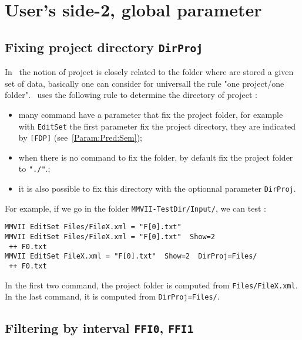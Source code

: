 \section{User's side-2, global parameter}



\subsection{Fixing project directory {\tt DirProj}}

\label{Fix:Dir:Proj}

In \PPP\, the notion of  project is closely related to the folder where
are stored a given set of data, basically one can consider for universall the rule 
"one project/one folder".
\PPP\, uses the following rule to determine the directory of project  :

\begin{itemize}
   \item  many command have a parameter that fix the project folder,
          for example with {\tt EditSet} the first parameter fix the 
          project directory, they are indicated by {\tt [FDP]} (see~\ref{Param:Pred:Sem});

   \item  when there is no command to fix the folder, by default \PPP
          fix the project folder to {\tt "./"}.;

    \item it is also possible to fix this directory with the optionnal
          parameter  {\tt DirProj}.
\end{itemize}

For example, if we go in the folder   {\tt {\MMVIDIR}MMVII-TestDir/Input/}, we can test :

\begin{verbatim}
MMVII EditSet Files/FileX.xml = "F[0].txt"   
MMVII EditSet Files/FileX.xml = "F[0].txt"  Show=2  
 ++ F0.txt
MMVII EditSet FileX.xml = "F[0].txt"  Show=2  DirProj=Files/
 ++ F0.txt
\end{verbatim}

In the first two command, the project folder is computed from {\tt Files/FileX.xml}.
In the last command, it is computed from {\tt DirProj=Files/}.




\subsection{Filtering by interval {\tt FFI0}, {\tt FFI1}}

